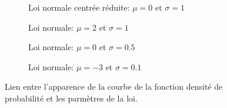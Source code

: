 \documentclass[a4paper,12pt]{scrartcl}
\begin{document}
\begin{figure}[]
\centering
\begin{multicols}{2}
\begin{subfigure}[b]{1\linewidth}
\caption{Loi normale centrée réduite: $\mu=0$ et $\sigma=1$}
\label{fig:norm01}
\end{subfigure}

\begin{subfigure}[b]{1\linewidth}
\caption{Loi normale: $\mu=2$ et $\sigma=1$}
\label{fig:norm21}
\end{subfigure}

\begin{subfigure}[b]{1\linewidth}
    \caption{Loi normale: $\mu=0$ et $\sigma=0.5$}
\label{fig:r_is_.8}
\end{subfigure}

\begin{subfigure}[b]{1\linewidth}
    \caption{Loi normale: $\mu=-3$ et $\sigma=0.1$}
\label{fig:r_is_0}
\end{subfigure}
\end{multicols}

\caption{Lien entre l'apparence de la courbe de la fonction densité de probabilité et les parmètres de la loi.}
\label{fig:gaussiennes}
\end{figure}
\end{document}
